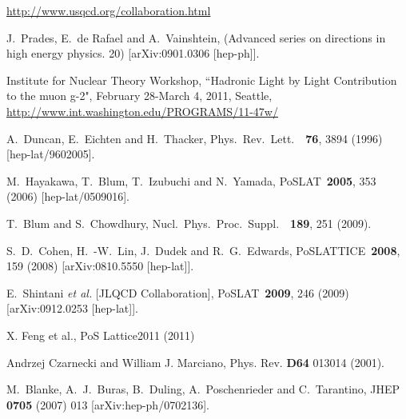\begin{thebibliography}{99}
\url{http://www.usqcd.org/collaboration.html}

  J.~Prades, E.~de Rafael and A.~Vainshtein,
  (Advanced series on directions in high energy physics. 20)
  [arXiv:0901.0306 [hep-ph]].

Institute for Nuclear Theory Workshop, ``Hadronic Light by Light Contribution to the muon g-2", February 28-March 4, 2011, Seattle, \url{http://www.int.washington.edu/PROGRAMS/11-47w/}

  A.~Duncan, E.~Eichten and H.~Thacker,
  Phys.\ Rev.\ Lett.\ \ {\bf 76}, 3894  (1996)
  [hep-lat/9602005].

  M.~Hayakawa, T.~Blum, T.~Izubuchi and N.~Yamada,
  PoSLAT\ {\bf 2005}, 353  (2006)
  [hep-lat/0509016].

  T.~Blum and S.~Chowdhury,
  Nucl.\ Phys.\ Proc.\ Suppl.\ \ {\bf 189}, 251  (2009).

  S.~D.~Cohen, H.~-W.~Lin, J.~Dudek and R.~G.~Edwards,
  PoSLATTICE\ {\bf 2008}, 159  (2008)
  [arXiv:0810.5550 [hep-lat]].


  E.~Shintani {\it et al.} [JLQCD Collaboration],
  PoSLAT\ {\bf 2009}, 246  (2009)
  [arXiv:0912.0253 [hep-lat]].

X. Feng et al., PoS Lattice2011 (2011)


  Andrzej Czarnecki and William J. Marciano,
Phys. Rev. {\bf D64} 013014 (2001).

  M.~Blanke, A.~J.~Buras, B.~Duling, A.~Poschenrieder and C.~Tarantino,
  JHEP {\bf 0705} (2007) 013
  [arXiv:hep-ph/0702136].


\end{thebibliography}
